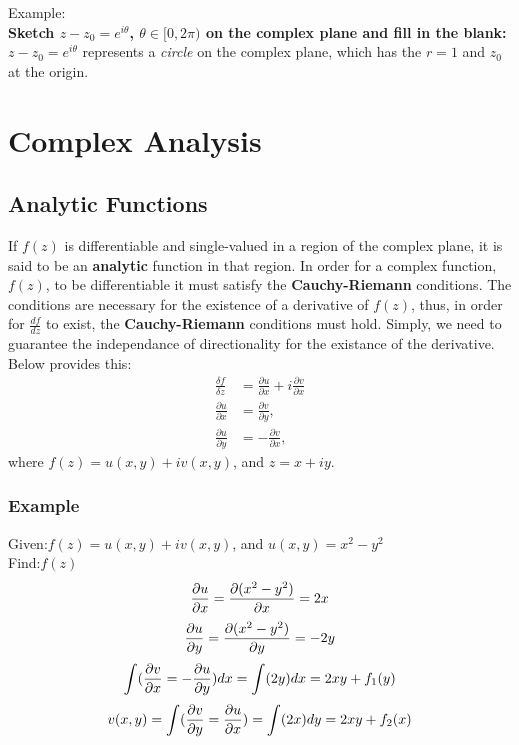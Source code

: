 \documentclass[12pt]{article}
\begin{document}
Example:
\\\textbf{Sketch $z-z_0 = e^{i \theta}$, $\theta \in [0,2\pi)$ on the complex plane and fill in the blank:} 
\\$z-z_0 = e^{i \theta}$ represents a \textit{circle} on the complex plane, which has the \textit{$r=1$} and \textit{$z_0$} at the origin.

\section{Complex Analysis}
\subsection{Analytic Functions}
If $f(z)$ is differentiable and single-valued in a region of the complex plane, it is said to be an \textbf{analytic} function in that region. In order for a complex function, $f(z)$, to be differentiable it must satisfy the \textbf{Cauchy-Riemann} conditions. The conditions are necessary for the existence of a derivative of $f(z)$, thus, in order for $\frac{df}{dz}$ to exist, the \textbf{Cauchy-Riemann} conditions must hold. Simply, we need to guarantee the independance of directionality for the existance of the derivative. Below provides this: 
\begin{align}
	\frac{\delta f}{\delta z} &= \frac{\partial u}{\partial x} + i \frac{\partial v}{\partial x}\\
    \frac{\partial u}{\partial x} &= \frac{\partial v}{\partial y}, \\
    \frac{\partial u}{\partial y} &= -\frac{\partial v}{\partial x},
\end{align}
where $f(z) = u(x, y) + iv(x, y)$, and $z = x + iy$.

\subsubsection*{Example}
Given:$f(z) = u(x,y) + iv(x,y)$, and $u(x,y) = x^2 - y^2$\\
Find:$f(z)$\\
\begin{equation*}
	\pdv{u}{x} = \pdv{(x^2 - y^2)}{x} = 2x
\end{equation*}
\begin{equation*}
	\pdv{u}{y} = \pdv{(x^2 - y^2)}{y}= -2y
\end{equation*}
\begin{equation*}
\int(\pdv{v}{x} = -\pdv{u}{y})dx = \int(2y)dx = 2xy + f_1(y)
\end{equation*}
\begin{equation*}
    v(x,y)=\int(\pdv{v}{y}=\pdv{u}{x})=\int(2x)dy = 2xy + f_2(x)
\end{equation*}
\end{document}
